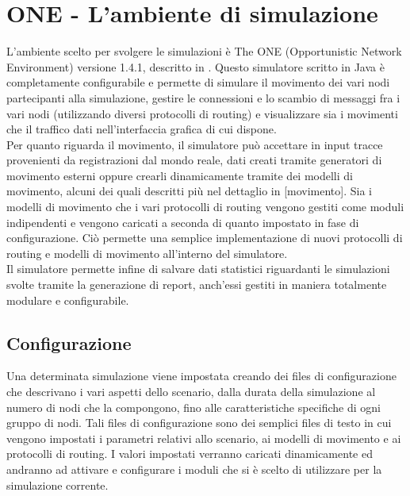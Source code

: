 
\chapter{ONE - L'ambiente di simulazione}\label{simulatore} %



\graphicspath{{2-simulatore/img/}}


L'ambiente scelto per svolgere le simulazioni è The ONE (Opportunistic Network Environment) versione 1.4.1, descritto in \cite{articoloONE}. Questo simulatore scritto in Java è completamente configurabile e permette di simulare il movimento dei vari nodi partecipanti alla simulazione, gestire le connessioni e lo scambio di messaggi fra i vari nodi (utilizzando diversi protocolli di routing) e visualizzare sia i movimenti che il traffico dati nell'interfaccia grafica di cui dispone.
\\

Per quanto riguarda il movimento, il simulatore può accettare in input tracce provenienti da registrazioni dal mondo reale, dati creati tramite generatori di movimento esterni oppure crearli dinamicamente tramite dei modelli di movimento, alcuni dei quali descritti più nel dettaglio in [movimento]. Sia i modelli di movimento che i vari protocolli di routing vengono gestiti come moduli indipendenti e vengono caricati a seconda di quanto impostato in fase di configurazione. Ciò permette una semplice implementazione di nuovi protocolli di routing e modelli di movimento all'interno del simulatore.
\\

Il simulatore permette infine di salvare dati statistici riguardanti le simulazioni svolte tramite la generazione di report, anch'essi gestiti in maniera totalmente modulare e configurabile.
\\

\section{Configurazione}
\label{configurazioneONE}
Una determinata simulazione viene impostata creando dei files di configurazione che descrivano i vari aspetti dello scenario, dalla durata della simulazione al numero di nodi che la compongono, fino alle caratteristiche specifiche di ogni gruppo di nodi. Tali files di configurazione sono dei semplici files di testo in cui vengono impostati i parametri relativi allo scenario, ai modelli di movimento e ai protocolli di routing. I valori impostati verranno caricati dinamicamente ed andranno ad attivare e configurare i moduli che si è scelto di utilizzare per la simulazione corrente.
\\

